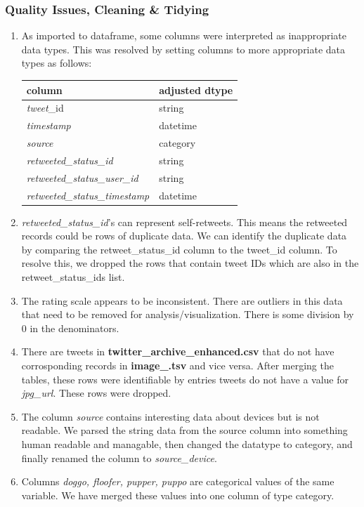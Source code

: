 \documentclass[10pt,a4paper]{report}
\begin{document}
		\subsubsection{Quality Issues, Cleaning \& Tidying}
			\begin{enumerate}
				\item As imported to dataframe, some columns were interpreted as inappropriate data types. This was resolved by setting 
				columns to more appropriate data types as follows:\\
					\begin{tabular}{ll}
						\toprule
						\textbf{column} & \textbf{adjusted dtype} \\
						\midrule
						\textit{tweet}\_id & string \\
						\textit{timestamp} & datetime \\
						\textit{source} & category \\
						\textit{retweeted\_status\_id} & string \\ 
						\textit{retweeted\_status\_user\_id} & string \\ 
						\textit{retweeted\_status\_timestamp} & datetime \\    
					\end{tabular}
				\item \textit{retweeted\_status\_id}'s can represent self-retweets. This means the retweeted records could be
					rows of duplicate data. We can identify the duplicate data by comparing the retweet\_status\_id column to the tweet\_id column. 
					To resolve this, we dropped the rows that contain tweet IDs which are also in the retweet\_status\_ids list.
				\item The rating scale appears to be inconsistent. There are outliers in this data that need 
					to be removed for analysis/visualization. There is some division by 0 in the denominators.
				\item There are tweets in \textbf{twitter\_archive\_enhanced.csv} that do not have corrosponding records in \textbf{image\_.tsv} and vice versa.
					After merging the tables, these rows were identifiable by entries tweets do not have a value for \textit{jpg\_url}. These rows were dropped.
				\item The column \textit{source} contains interesting data about devices but is not readable. We parsed the string data from the source column into
					something human readable and managable, then changed the datatype to category, and finally renamed the column to \textit{source\_device}.
				\item Columns \textit{doggo, floofer, pupper, puppo} are categorical values of the same variable. We have merged these values into one column of type category. 
			\end{enumerate} 
\end{document}
